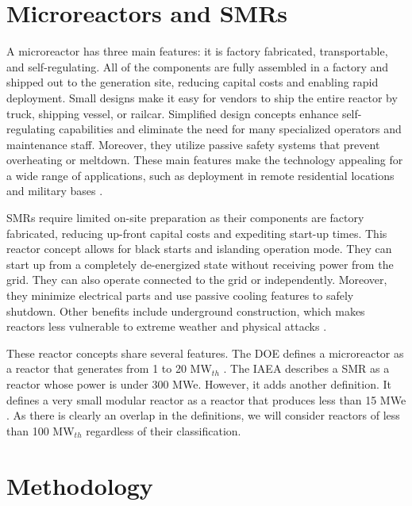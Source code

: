 \documentclass[11pt,letterpaper]{article}
\begin{document}
\section{Microreactors and \glspl{SMR}}
\label{sec:reactors}

A microreactor has three main features: it is factory fabricated, transportable, and self-regulating.
All of the components are fully assembled in a factory and shipped out to the generation site, reducing capital costs and enabling rapid deployment.
Small designs make it easy for vendors to ship the entire reactor by truck, shipping vessel, or railcar.
Simplified design concepts enhance self-regulating capabilities and eliminate the need for many specialized operators and maintenance staff.
Moreover, they utilize passive safety systems that prevent overheating or meltdown.
These main features make the technology appealing for a wide range of applications, such as deployment in remote residential locations and military bases \cite{us-doe_ultimate_2019}.

\glspl{SMR} require limited on-site preparation as their components are factory fabricated, reducing up-front capital costs and expediting start-up times.
This reactor concept allows for black starts and islanding operation mode.
They can start up from a completely de-energized state without receiving power from the grid.
They can also operate connected to the grid or independently.
Moreover, they minimize electrical parts and use passive cooling features to safely shutdown.
Other benefits include underground construction, which makes reactors less vulnerable to extreme weather and physical attacks \cite{us-doe_ultimate_2019}.

These reactor concepts share several features.
The \gls{DOE} defines a microreactor as a reactor that generates from 1 to 20 MW$_{th}$ \cite{us-doe_ultimate_2019}.
The \gls{IAEA} describes a \gls{SMR} as a reactor whose power is under 300 MWe.
However, it adds another definition.
It defines a very small modular reactor as a reactor that produces less than 15 MWe \cite{world_nuclear_association_small_2020}.
As there is clearly an overlap in the definitions, we will consider reactors of less than 100 MW$_{th}$ regardless of their classification.

\section{Methodology}
\label{sec:metho}
\end{document}
